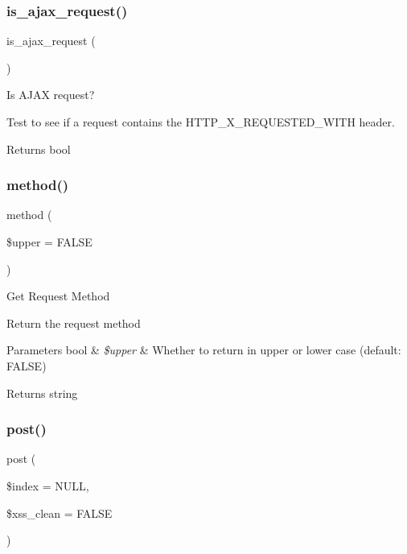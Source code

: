 \subsubsection{\texorpdfstring{is\+\_\+ajax\+\_\+request()}{is\_ajax\_request()}}
{\footnotesize\ttfamily is\+\_\+ajax\+\_\+request (\begin{DoxyParamCaption}{ }\end{DoxyParamCaption})}

Is A\+J\+AX request?

Test to see if a request contains the H\+T\+T\+P\+\_\+\+X\+\_\+\+R\+E\+Q\+U\+E\+S\+T\+E\+D\+\_\+\+W\+I\+TH header.

\begin{DoxyReturn}{Returns}
bool 
\end{DoxyReturn}
\mbox{\label{class_c_i___input_aaa22626885bdf9dda2346ee6422203ef}} 
\subsubsection{\texorpdfstring{method()}{method()}}
{\footnotesize\ttfamily method (\begin{DoxyParamCaption}\item[{}]{\$upper = {\ttfamily FALSE} }\end{DoxyParamCaption})}

Get Request Method

Return the request method


\begin{DoxyParams}[1]{Parameters}
bool & {\em \$upper} & Whether to return in upper or lower case (default\+: F\+A\+L\+SE) \\
\hline
\end{DoxyParams}
\begin{DoxyReturn}{Returns}
string 
\end{DoxyReturn}
\mbox{\label{class_c_i___input_a50ac0e340a9da4d85cc976e78d99a7c0}} 
\subsubsection{\texorpdfstring{post()}{post()}}
{\footnotesize\ttfamily post (\begin{DoxyParamCaption}\item[{}]{\$index = {\ttfamily NULL},  }\item[{}]{\$xss\+\_\+clean = {\ttfamily FALSE} }\end{DoxyParamCaption})}

